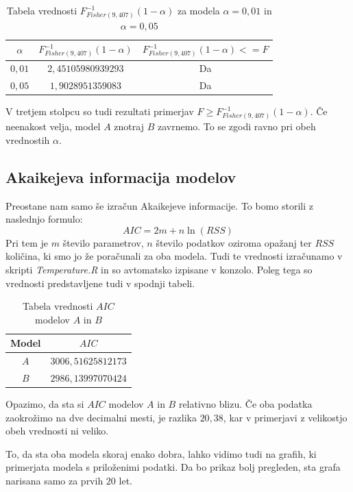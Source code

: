 \documentclass[a4paper, 10pt]{article}
\begin{document}
		\begin{table}[h!]
			\centering
			\begin{tabular}{| c | c | c |}
				\hline
				$\alpha$ & $F_{Fisher(9, 407)}^{-1}(1-\alpha)$ & $F_{Fisher(9, 407)}^{-1}(1-\alpha) <= F$\\ \hline
				$0{,}01$ & $2{,}45105980939293$ & Da \\ \hline
				$0{,}05$ & $1{,}9028951359083$ & Da \\ \hline
			\end{tabular}
			\caption{Tabela vrednosti $F_{Fisher(9, 407)}^{-1}(1-\alpha)$ za modela $\alpha = 0{,}01$ in $\alpha = 0{,}05$}
		\end{table}
		V tretjem stolpcu so tudi rezultati primerjav $F \geq F_{Fisher(9, 407)}^{-1}(1-\alpha)$. Če neenakost velja, model $A$ znotraj $B$ zavrnemo. To se zgodi ravno pri obeh vrednostih $\alpha$. 
		
	\subsection{Akaikejeva informacija modelov}\label{subsect: 3B}
	Preostane nam samo še izračun Akaikejeve informacije. To bomo storili z naslednjo formulo: $$AIC = 2m + n\ln(RSS)$$ Pri tem je $m$ število parametrov, $n$ število podatkov oziroma opažanj ter $RSS$ količina, ki smo jo že poračunali za oba modela. Tudi te vrednosti izračunamo v skripti \textit{Temperature.R} in so avtomatsko izpisane v konzolo. Poleg tega so vrednosti predstavljene tudi v spodnji tabeli.

	\begin{table}[h!]
		\centering
		\begin{tabular}{| c | c |}
			\hline
			Model & $AIC$ \\ \hline
			$A$ & $3006{,}51625812173$ \\ \hline
			$B$ & $2986{,}13997070424$ \\ \hline
		\end{tabular}
		\caption{Tabela vrednosti $AIC$ modelov $A$ in $B$}
	\end{table}
	
	Opazimo, da sta si $AIC$ modelov $A$ in $B$ relativno blizu. Če oba podatka zaokrožimo na dve decimalni mesti, je razlika $20{,}38$, kar v primerjavi z velikostjo obeh vrednosti ni veliko. 
	
	To, da sta oba modela skoraj enako dobra, lahko vidimo tudi na grafih, ki primerjata modela s priloženimi podatki. Da bo prikaz bolj pregleden, sta grafa narisana samo za prvih $20$ let.
	
\end{document}
